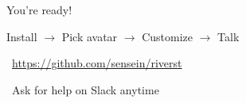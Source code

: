\documentclass[aspectratio=169]{beamer}
\begin{document}
\begin{frame}
\begin{center}
\vspace{0.5cm}
\Huge You're ready!

\vspace{0.8cm}

\Large Install $\rightarrow$ Pick avatar $\rightarrow$ Customize $\rightarrow$ Talk

\vspace{0.8cm}

\normalsize
\faGithub\ \url{https://github.com/sensein/riverst}

\vspace{0.3cm}

\faEnvelope\ Ask for help on Slack anytime
\end{center}
\end{frame}
\end{document}
